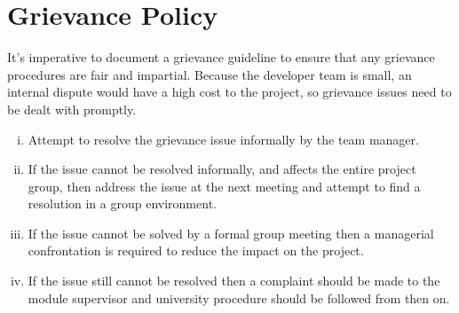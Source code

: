 \section{Grievance Policy}
It's imperative to document a grievance guideline to ensure that any grievance procedures are fair and impartial. %
 Because the developer team is small, an internal dispute would have a high cost to the project, so grievance issues need to be dealt with promptly. 
  
\begin{enumerate}[i)]
    \item{Attempt to resolve the grievance issue informally by the team manager.}
    \item{If the issue cannot be resolved informally, and affects the entire project group, then address the issue at the next meeting and attempt to find a resolution in a group environment.}
    \item{If the issue cannot be solved by a formal group meeting then a managerial confrontation is required to reduce the impact on the project.}
    \item{If the issue still cannot be resolved then a complaint should be made to the module supervisor and university procedure should be followed from then on.}
\end{enumerate}